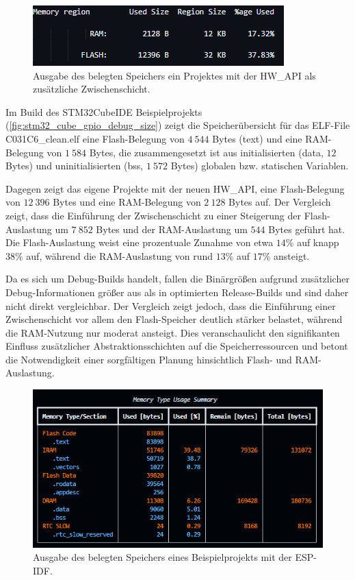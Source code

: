 \begin{figure}[H]
	\includegraphics[width=\textwidth]{Pics/stm32c031c6_gpio_debug_size_hw_api.png}
	\caption{Ausgabe des belegten Speichers ein Projektes mit der HW\_API als zusätzliche Zwischenschicht.}
	\label{fig:stm32_hw_api_gpio_debug_size}
\end{figure}

Im Build des STM32CubeIDE Beispielprojekts (\cref{fig:stm32_cube_gpio_debug_size}) zeigt die Speicherübersicht für das ELF-File C031C6\_clean.elf eine Flash-Belegung von $4\ 544$ Bytes (text) und eine RAM-Belegung von $1\ 584$ Bytes, die zusammengesetzt ist aus initialisierten (data, $12$ Bytes) und uninitialisierten (bss, $1\ 572$ Bytes) globalen bzw. statischen Variablen.

Dagegen zeigt das eigene Projekte mit der neuen HW\_API, eine Flash-Belegung von $12\ 396$ Bytes und eine RAM-Belegung von $2\ 128$ Bytes auf. Der Vergleich zeigt, dass die Einführung der Zwischenschicht zu einer Steigerung der Flash-Auslastung um $7\ 852$ Bytes und der RAM-Auslastung um $544$ Bytes geführt hat. 
Die Flash-Auslastung weist eine prozentuale Zunahme von etwa $14$\% auf knapp $38$\% auf, während die RAM-Auslastung von rund $13$\% auf $17$\% ansteigt.

Da es sich um Debug-Builds handelt, fallen die Binärgrößen aufgrund zusätzlicher Debug-Informationen größer aus als in optimierten Release-Builds und sind daher nicht direkt vergleichbar. 
Der Vergleich zeigt jedoch, dass die Einführung einer Zwischenschicht vor allem den Flash-Speicher deutlich stärker belastet, während die RAM-Nutzung nur moderat ansteigt. 
Dies veranschaulicht den signifikanten Einfluss zusätzlicher Abstraktionsschichten auf die Speicherressourcen und betont die Notwendigkeit einer sorgfältigen Planung hinsichtlich Flash- und RAM-Auslastung.
\begin{figure}[H]
	\includegraphics[width=\textwidth]{Pics/esp32c6_sample_project_size.png}
	\caption{Ausgabe des belegten Speichers eines Beispielprojekts mit der ESP-IDF.}
	\label{fig:esp32_sample_size}
\end{figure}


